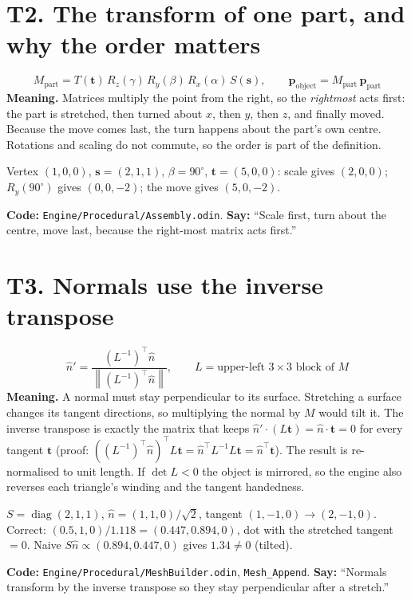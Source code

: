 \documentclass[11pt,a4paper]{article}
\newcommand{\code}[1]{{\small\texttt{#1}}}
\begin{document}
\section{T2. The transform of one part, and why the order matters}
\[M_{\text{part}}=T(\mathbf t)\,R_z(\gamma)\,R_y(\beta)\,R_x(\alpha)\,S(\mathbf s),\qquad \mathbf p_{\text{object}}=M_{\text{part}}\,\mathbf p_{\text{part}}\]
\textbf{Meaning.} Matrices multiply the point from the right, so the \emph{rightmost} acts first: the part is stretched, then turned about $x$, then $y$, then $z$, and finally moved. Because the move comes last, the turn happens about the part's own centre. Rotations and scaling do not commute, so the order is part of the definition.
\begin{ex}Vertex $(1,0,0)$, $\mathbf s=(2,1,1)$, $\beta=90^{\circ}$, $\mathbf t=(5,0,0)$: scale gives $(2,0,0)$; $R_y(90^{\circ})$ gives $(0,0,-2)$; the move gives $(5,0,-2)$.\end{ex}
\textbf{Code:} \code{Engine/Procedural/Assembly.odin}. \textbf{Say:} ``Scale first, turn about the centre, move last, because the right-most matrix acts first.''

\section{T3. Normals use the inverse transpose}
\[\hat n'=\frac{(L^{-1})^{\top}\hat n}{\left\lVert(L^{-1})^{\top}\hat n\right\rVert},\qquad L=\text{upper-left }3\times3\text{ block of }M\]
\textbf{Meaning.} A normal must stay perpendicular to its surface. Stretching a surface changes its tangent directions, so multiplying the normal by $M$ would tilt it. The inverse transpose is exactly the matrix that keeps $\hat n'\cdot(L\mathbf t)=\hat n\cdot\mathbf t=0$ for every tangent $\mathbf t$ (proof: $((L^{-1})^{\top}\hat n)^{\top}L\mathbf t=\hat n^{\top}L^{-1}L\mathbf t=\hat n^{\top}\mathbf t$). The result is re-normalised to unit length. If $\det L<0$ the object is mirrored, so the engine also reverses each triangle's winding and the tangent handedness.
\begin{ex}$S=\operatorname{diag}(2,1,1)$, $\hat n=(1,1,0)/\sqrt2$, tangent $(1,-1,0)\to(2,-1,0)$. Correct: $(0.5,1,0)/1.118=(0.447,0.894,0)$, dot with the stretched tangent $=0$. Naive $S\hat n\propto(0.894,0.447,0)$ gives $1.34\neq0$ (tilted).\end{ex}
\textbf{Code:} \code{Engine/Procedural/MeshBuilder.odin}, \code{Mesh\_Append}. \textbf{Say:} ``Normals transform by the inverse transpose so they stay perpendicular after a stretch.''
\end{document}
